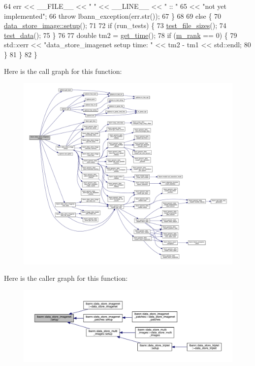 \begin{DoxyCode}
64     err << \_\_FILE\_\_ << \textcolor{stringliteral}{" "} << \_\_LINE\_\_ << \textcolor{stringliteral}{" :: "}
65         << \textcolor{stringliteral}{"not yet implemented"};
66     \textcolor{keywordflow}{throw} lbann\_exception(err.str());
67   \} 
68   
69   \textcolor{keywordflow}{else} \{
70     \hyperlink{classlbann_1_1data__store__image_a79280b3aa9a207dfacad2bcc9824ec73}{data\_store\_image::setup}();
71 
72     \textcolor{keywordflow}{if} (run\_tests) \{
73       \hyperlink{classlbann_1_1data__store__imagenet_a1c928ccfb4e75ffe4cefd62f37c072f8}{test\_file\_sizes}();
74       \hyperlink{classlbann_1_1data__store__imagenet_a1ed5548a409afec61489102f7f080467}{test\_data}();
75     \}  
76 
77     \textcolor{keywordtype}{double} tm2 = \hyperlink{namespacelbann_a478d36031ff0659893c4322cd856157f}{get\_time}();
78     \textcolor{keywordflow}{if} (\hyperlink{classlbann_1_1generic__data__store_a87695bfd2d1ed0dbe01d99108e3f68b7}{m\_rank} == 0) \{
79       std::cerr << \textcolor{stringliteral}{"data\_store\_imagenet setup time: "} << tm2 - tm1 << std::endl;
80     \}
81   \}
82 \}
\end{DoxyCode}
Here is the call graph for this function\+:\nopagebreak
\begin{figure}[H]
\begin{center}
\leavevmode
\includegraphics[width=350pt]{classlbann_1_1data__store__imagenet_a611aa1734a491c443396a077b49fe4fe_cgraph}
\end{center}
\end{figure}
Here is the caller graph for this function\+:\nopagebreak
\begin{figure}[H]
\begin{center}
\leavevmode
\includegraphics[width=350pt]{classlbann_1_1data__store__imagenet_a611aa1734a491c443396a077b49fe4fe_icgraph}
\end{center}
\end{figure}
